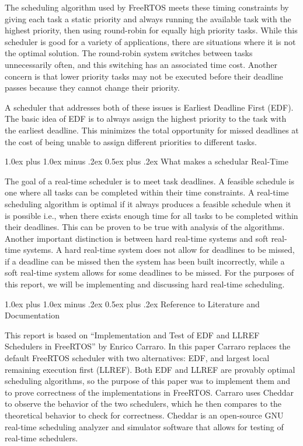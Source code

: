 \documentclass[transmag]{IEEEtran}
\makeatletter
\renewcommand{\section}{\@startsection{section}{1}{\z@}%
  {1.0ex plus 1.0ex minus .2ex}%
  {0.5ex plus .2ex}%
  {\normalfont\large\bfseries}}
\makeatother
\begin{document}
The scheduling algorithm used by FreeRTOS meets these timing constraints by giving each task a static priority and always running the available task with the highest priority, then using round-robin for equally high priority tasks.  While this scheduler is good for a variety of applications, there are situations where it is not the optimal solution. The round-robin system switches between tasks unnecessarily often, and this switching has an associated time cost. Another concern is that lower priority tasks may not be executed before their deadline passes because they cannot change their priority.  

A scheduler that addresses both of these issues is Earliest Deadline First (EDF). The basic idea of EDF is to always assign the highest priority to the task with the earliest deadline. This minimizes the total opportunity for missed deadlines at the cost of being unable to assign different priorities to different tasks. 

\vspace{0.5em}

\section{What makes a schedular Real-Time} 

The goal of a real-time scheduler is to meet task deadlines. A feasible schedule is one where all tasks can be completed within their time constraints. A real-time scheduling algorithm is optimal if it always produces a feasible schedule when it is possible i.e., when there exists enough time for all tasks to be completed within their deadlines. This can be proven to be true with analysis of the algorithms. Another important distinction is between hard real-time systems and soft real-time systems. A hard real-time system does not allow for deadlines to be missed, if a deadline can be missed then the system has been built incorrectly, while a soft real-time system allows for some deadlines to be missed. For the purposes of this report, we will be implementing and discussing hard real-time scheduling. 



\section{Reference to Literature and Documentation}

This report is based on “Implementation and Test of EDF and LLREF Schedulers in FreeRTOS” by Enrico Carraro. In this paper Carraro replaces the default FreeRTOS scheduler with two alternatives: EDF, and largest local remaining execution first (LLREF). Both EDF and LLREF are provably optimal scheduling algorithms, so the purpose of this paper was to implement them and to prove correctness of the implementations in FreeRTOS. Carraro uses Cheddar to observe the behavior of the two schedulers, which he then compares to the theoretical behavior to check for correctness. Cheddar is an open-source GNU real-time scheduling analyzer and simulator software that allows for testing of real-time schedulers. 
\end{document}
